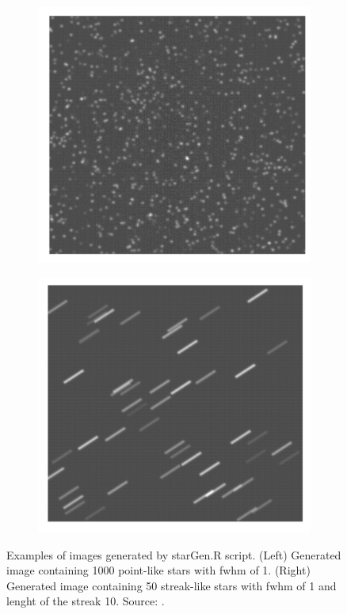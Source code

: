 \begin{figure}[!h]
    \centering
    \begin{subfigure}{.35\textwidth}
        \centering
        \includegraphics[width=\textwidth]{images/stargenRimage.png}
        \label{fig:stargenImg1}
    \end{subfigure}
    \begin{subfigure}{.35\textwidth}
        \centering
        \includegraphics[width=\textwidth]{images/starGenRimage2.png}
        \label{fig:stargenImg2}
    \end{subfigure}
    \caption[Examples of  images generated by starGen.R script.]
    {Examples of  images generated by starGen.R script. 
    (Left) Generated image containing 1000 point-like stars with fwhm of 1. (Right) Generated image containing 50 streak-like stars with fwhm of 1 and lenght of the streak 10.
    Source: \cite{thesisKyselica}.}
    \label{fig:stargenImages}
\end{figure}

